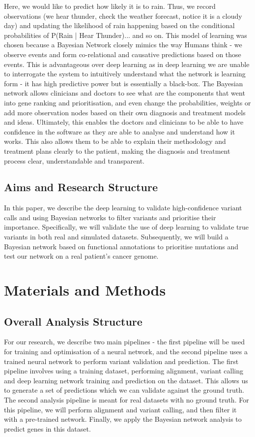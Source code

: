 \documentclass{article}
\begin{document}
Here, we would like to predict how likely it is to rain. Thus, we record observations (we hear thunder, check the weather forecast, notice it is a cloudy day) and updating the likelihood of rain happening based on the conditional probabilities of P(Rain | Hear Thunder)... and so on. This model of learning was chosen because a Bayesian Network closely mimics the way Humans think - we observe events and form co-relational and causative predictions based on those events. This is advantageous over deep learning as in deep learning we are unable to interrogate the system to intuitively understand what the network is learning form - it has high predictive power but is essentially a black-box. The Bayesian network allows clinicians and doctors to see what are the components that went into gene ranking and prioritisation, and even change the probabilities, weights or add more observation nodes based on their own diagnosis and treatment models and ideas. Ultimately, this enables the doctors and clinicians to be able to have confidence in the software as they are able to analyse and understand how it works. This also allows them to be able to explain their methodology and treatment plans clearly to the patient, making the diagnosis and treatment process clear, understandable and transparent.

\subsection{Aims and Research Structure}
In this paper, we describe the deep learning to validate high-confidence variant calls and using Bayesian networks to filter variants and prioritise their importance. Specifically, we will validate the use of deep learning to validate true variants in both real and simulated datasets. Subsequently, we will build a Bayesian network based on functional annotations to prioritise mutations and test our network on a real patient's cancer genome.

\newpage
\section{Materials and Methods}

\subsection{Overall Analysis Structure}
For our research, we describe two main pipelines - the first pipeline will be used for training and optimisation of a neural network, and the second pipeline uses a trained neural network to perform variant validation and prediction. The first pipeline involves using a training dataset, performing alignment, variant calling and deep learning network training and prediction on the dataset. This allows us to generate a set of predictions which we can validate against the ground truth. The second analysis pipeline is meant for real datasets with no ground truth. For this pipeline, we will perform alignment and variant calling, and then filter it with a pre-trained network. Finally, we apply the Bayesian network analysis to predict genes in this dataset.
\end{document}
